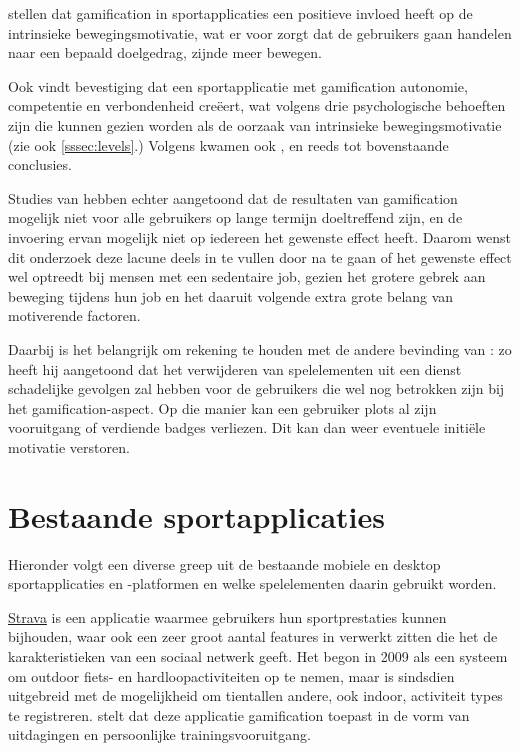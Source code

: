 \textcite{Kari2016} stellen dat gamification in sportapplicaties een positieve invloed heeft op de intrinsieke bewegingsmotivatie, wat er voor zorgt dat de gebruikers gaan handelen naar een bepaald doelgedrag, zijnde meer bewegen.

Ook \textcite{Bitrian2020} vindt bevestiging dat een sportapplicatie met gamification autonomie, competentie en verbondenheid creëert, wat volgens \textcite{ManzanoLeon2021} drie psychologische behoeften zijn die kunnen gezien worden als de oorzaak van intrinsieke bewegingsmotivatie (zie ook \ref{sssec:levels}.) Volgens \textcite{Tu2019} kwamen ook \textcite{Lewis2016}, \textcite{Liu2017} en \textcite{Tabak2015} reeds tot bovenstaande conclusies.

Studies van \textcite{Hamari2013a} hebben echter aangetoond dat de resultaten van gamification mogelijk niet voor alle gebruikers op lange termijn doeltreffend zijn, en de invoering ervan mogelijk niet op iedereen het gewenste effect heeft. Daarom wenst dit onderzoek deze lacune deels in te vullen door na te gaan of het gewenste effect wel optreedt bij mensen met een sedentaire job, gezien het grotere gebrek aan beweging tijdens hun job en het daaruit volgende extra grote belang van motiverende factoren.

Daarbij is het belangrijk om rekening te houden met de andere bevinding van \textcite{Hamari2013a}: zo heeft hij aangetoond dat het verwijderen van spelelementen uit een dienst schadelijke gevolgen zal hebben voor de gebruikers die wel nog betrokken zijn bij het gamification-aspect. Op die manier kan een gebruiker plots al zijn vooruitgang of verdiende badges verliezen. Dit kan dan weer eventuele initiële motivatie verstoren.

\section{Bestaande sportapplicaties}
Hieronder volgt een diverse greep uit de bestaande mobiele en desktop sportapplicaties en -platformen en welke spelelementen daarin gebruikt worden.

\href{https://www.strava.com/}{Strava} is een applicatie waarmee gebruikers hun sportprestaties kunnen bijhouden, waar ook een zeer groot aantal features in verwerkt zitten die het de karakteristieken van een sociaal netwerk geeft. Het begon in 2009 als een systeem om outdoor fiets- en hardloopactiviteiten op te nemen, maar is sindsdien uitgebreid met de mogelijkheid om tientallen andere, ook indoor, activiteit types te registreren. \textcite{Barratt2017} stelt dat deze applicatie gamification toepast in de vorm van uitdagingen en persoonlijke trainingsvooruitgang.

